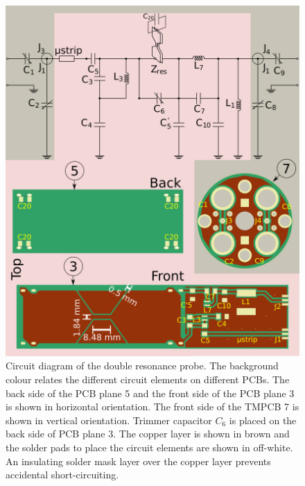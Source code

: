 \documentclass[preprint,5p]{elsarticle}
\begin{document}
\cbend
\cbstart
\begin{figure}
\centering
\includegraphics[width=\linewidth,keepaspectratio=true]{./figures/ms5n17-tlp-im-180110-circuit-diagram.png}
\caption{Circuit diagram of the double resonance probe. The background colour relates the different circuit elements on different PCBs. The back side of the PCB plane 5 and the front side of the PCB plane 3 is shown in horizontal orientation. The front side of the TMPCB 7 is shown in vertical orientation. Trimmer capacitor $C_6$ is placed on the back side of PCB plane 3. The copper layer is shown in brown and the solder pads to place the circuit elements are shown in off-white. An insulating solder mask layer over the copper layer prevents accidental short-circuiting.
}
\label{fig:circuit}
\end{figure}
\cbend
\end{document}
